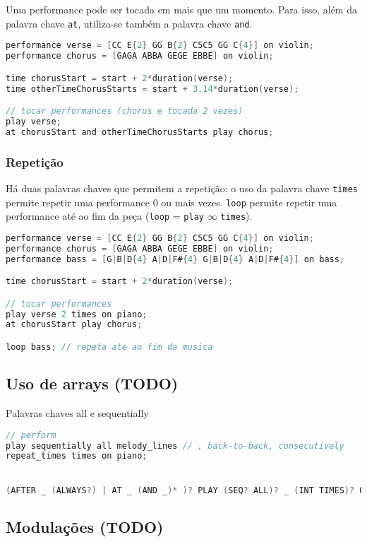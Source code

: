 \documentclass{article}
\begin{document}
Uma performance pode ser tocada em mais que um momento. Para isso, além da palavra chave \texttt{at}, utiliza-se também a palavra chave  \texttt{and}.
\begin{lstlisting}[language=C]
performance verse = [CC E{2} GG B{2} C5C5 GG C{4}] on violin;
performance chorus = [GAGA ABBA GEGE EBBE] on violin;

time chorusStart = start + 2*duration(verse);
time otherTimeChorusStarts = start + 3.14*duration(verse);

// tocar performances (chorus e tocada 2 vezes)
play verse;
at chorusStart and otherTimeChorusStarts play chorus;
\end{lstlisting}

\subsubsection{Repetição}
Há duas palavras chaves que permitem a repetição: o uso da palavra chave \texttt{times} permite repetir uma performance 0 ou mais vezes. \texttt{loop} permite repetir uma performance até ao fim da peça  (\texttt{loop} = \texttt{play} $\infty$ \texttt{times}).
\begin{lstlisting}[language=C]
performance verse = [CC E{2} GG B{2} C5C5 GG C{4}] on violin;
performance chorus = [GAGA ABBA GEGE EBBE] on violin;
performance bass = [G|B|D{4} A|D|F#{4} G|B|D{4} A|D|F#{4}] on bass;

time chorusStart = start + 2*duration(verse);

// tocar performances
play verse 2 times on piano;
at chorusStart play chorus;

loop bass; // repeta ate ao fim da musica
\end{lstlisting}

\subsection{Uso de arrays (TODO)}
Palavras chaves all e sequentially
\begin{lstlisting}[language=C]
// perform
play sequentially all melody_lines // , back-to-back, consecutively
repeat_times times on piano;


(AFTER _ (ALWAYS?) | AT _ (AND _)* )? PLAY (SEQ? ALL)? _ (INT TIMES)? ON INST;

\end{lstlisting}

\subsection{Modulações (TODO)}
\end{document}
